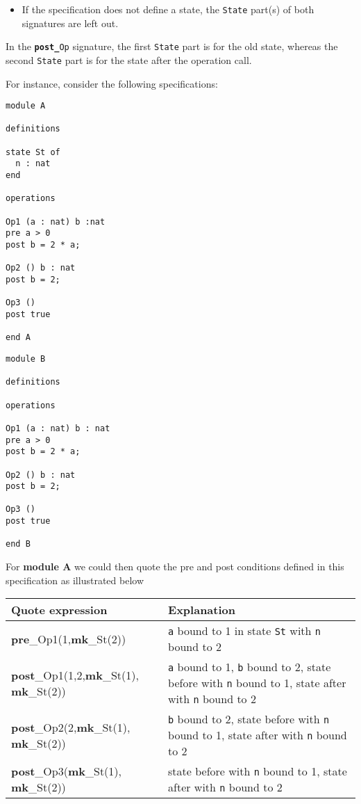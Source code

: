 \documentclass{overturerepchap}
\newcommand{\keyw}[1]{{\bf\ttfamily #1}}
\begin{document}
{\begin{description}
\begin{itemize}
\item If the specification does not define a state, the {\tt State} part(s)
  of both signatures are left out.
\end{itemize}

In the {\tt \keyw{post\_}Op} signature, the first {\tt State} part is for
the old state, whereas the second {\tt State} part is for the
state after the operation call.

For instance, consider the following specifications:

\begin{lstlisting}
module A

definitions

state St of
  n : nat
end

operations

Op1 (a : nat) b :nat
pre a > 0
post b = 2 * a;

Op2 () b : nat
post b = 2;

Op3 ()
post true

end A
\end{lstlisting}

\begin{lstlisting}
module B

definitions

operations

Op1 (a : nat) b : nat
pre a > 0
post b = 2 * a;

Op2 () b : nat
post b = 2;

Op3 ()
post true

end B
\end{lstlisting}

For \textbf{module A} we could then quote the pre and post conditions
defined in this specification as illustrated below

\begin{tabular}{|p{}|p{}|} \hline
\textrm{Quote expression} & Explanation \\ \hline
\keyw{pre}\_Op1(1,\keyw{mk}\_St(2))
  & \texttt{a} bound to 1 in state \texttt{St} with \texttt{n}  bound to 2 \\
\keyw{post}\_Op1(1,2,\keyw{mk}\_St(1), \keyw{mk}\_St(2))
  & \texttt{a} bound to 1, \texttt{b} bound to 2, state before with
    \texttt{n} bound to 1, state after with \texttt{n} bound to 2 \\
\keyw{post}\_Op2(2,\keyw{mk}\_St(1), \keyw{mk}\_St(2))
  & \texttt{b} bound to 2, state before with \texttt{n} bound to 1, state
    after with \texttt{n} bound to 2 \\
\keyw{post}\_Op3(\keyw{mk}\_St(1), \keyw{mk}\_St(2))
  & state before with \texttt{n} bound to 1, state after with
    \texttt{n} bound to 2 \\
\hline
\end{tabular}


\end{description}}
\end{document}

